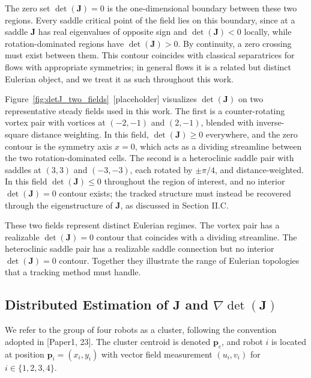 \documentclass[lettersize,journal]{IEEEtran}
\begin{document}
The zero set $\det(\mathbf{J}) = 0$ is the one-dimensional boundary between these two regions. Every saddle critical point of the field lies on this boundary, since at a saddle $\mathbf{J}$ has real eigenvalues of opposite sign and $\det(\mathbf{J}) < 0$ locally, while rotation-dominated regions have $\det(\mathbf{J}) > 0$. By continuity, a zero crossing must exist between them. This contour coincides with classical separatrices for flows with appropriate symmetries; in general flows it is a related but distinct Eulerian object, and we treat it as such throughout this work.

Figure~\ref{fig:detJ_two_fields}~[placeholder] visualizes $\det(\mathbf{J})$ on two representative steady fields used in this work. The first is a counter-rotating vortex pair with vortices at $(-2,-1)$ and $(2,-1)$, blended with inverse-square distance weighting. In this field, $\det(\mathbf{J}) \geq 0$ everywhere, and the zero contour is the symmetry axis $x = 0$, which acts as a dividing streamline between the two rotation-dominated cells. The second is a heteroclinic saddle pair with saddles at $(3,3)$ and $(-3,-3)$, each rotated by $\pm \pi/4$, and distance-weighted. In this field $\det(\mathbf{J}) \leq 0$ throughout the region of interest, and no interior $\det(\mathbf{J}) = 0$ contour exists; the tracked structure must instead be recovered through the eigenstructure of $\mathbf{J}$, as discussed in Section II.C.

These two fields represent distinct Eulerian regimes. The vortex pair has a realizable $\det(\mathbf{J}) = 0$ contour that coincides with a dividing streamline. The heteroclinic saddle pair has a realizable saddle connection but no interior $\det(\mathbf{J}) = 0$ contour. Together they illustrate the range of Eulerian topologies that a tracking method must handle.


\subsection{Distributed Estimation of $\mathbf{J}$ and $\nabla\det(\mathbf{J})$}

We refer to the group of four robots as a cluster, following the convention adopted in [Paper1, 23]. The cluster centroid is denoted $\mathbf{p}_c$, and robot $i$ is located at position $\mathbf{p}_i = (x_i, y_i)$ with vector field measurement $(u_i, v_i)$ for $i \in \{1, 2, 3, 4\}$.
\end{document}

